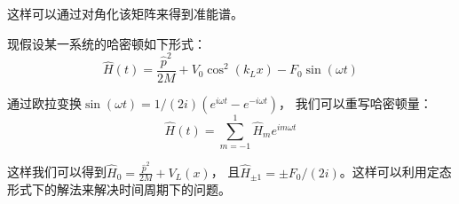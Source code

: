 \documentclass{article}
\begin{document}
    这样可以通过对角化该矩阵来得到准能谱。
    
    现假设某一系统的哈密顿如下形式：
    \begin{equation}
        \hat{H}(t)=\frac{\hat{p}^{2}}{2 M}+V_{0} \cos ^{2}\left(k_{L} x\right)-F_{0} \sin (\omega t)
    \end{equation}

    通过欧拉变换$\sin (\omega t)=1 /(2 i)\left(e^{i \omega t}-e^{-i \omega t}\right)$，
    我们可以重写哈密顿量：
    \begin{equation}
        \hat{H}(t)=\sum_{m=-1}^{1} \hat{H}_{m} e^{i m \omega t}
    \end{equation}

    这样我们可以得到$\hat{H}_{0} = \frac{\hat{p}^{2}}{2 M}+V_{L}(x)$，
    且$\hat{H}_{ \pm 1} = \pm F_{0} /(2 i)$。这样可以利用定态形式下的解法来解决时间周期下的问题。
\end{document}
